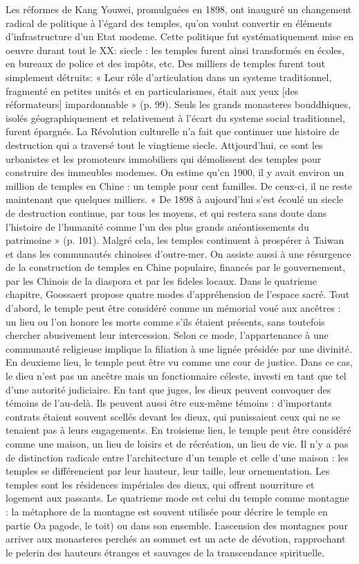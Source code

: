 \begin{singlequote}
Les réformes de Kang Youwei, promulguées en 1898, ont inauguré un changement radical de politique à l'égard des temples, qu'on voulut convertir en éléments d'infrastructure d'un Etat modeme. Cette politique fut systématiquement mise en oeuvre durant tout le XX: siecle : les temples furent ainsi transformés en écoles, en bureaux de police et des impôts, etc. Des milliers de temples furent tout simplement détruits: « Leur rôle d'articulation dans un systeme traditionnel, fragmenté en petites unités et en particularismes, était aux yeux [des réformateurs] impardonnable » (p. 99). Seuls les grands monasteres bouddhiques, isolés géographiquement et relativement à l'écart du systeme social traditionnel, furent épargnés. La Révolution culturelle n'a fait que continuer une histoire de destruction qui a traversé tout le vingtieme siecle. Attjourd'hui, ce sont les urbanistes et les promoteurs immobiliers qui démolissent des temples pour construire des immeubles modemes. On estime qu'cn 1900, il y avait environ un million de temples en Chine : un temple pour
cent familles. De ceux-ci, il ne reste maintenant que quelques milliers. « De 1898 à aujourd'hui s'est écoulé un siecle de destruction continue, par tous les moyens, et qui restera sans doute dans l'histoire de l'humanité comme l'un des plus grands anéantissements du patrimoine » (p. 101). Malgré cela, les temples continuent à prospérer à Taiwan et dans les communautés chinoises d'outre-mer. On assiste aussi à une résurgence de la construction de temples en Chine populaire, financés par le gouvernement, par les Chinois de la diaspora et par les fideles locaux.
Dans le quatrieme chapitre, Goossaert propose quatre modes d'appréhension de l'espace sacré. Tout d'abord, le temple peut être considéré comme un mémorial voué aux ancêtres : un lieu ou l'on honore les morts comme s'ils étaient présents, sans toutefois chercher abusivement leur intercession. Selon ce mode, l'appartenance à une communauté religieuse implique la filiation à une lignée présidée par une divinité. En deuxieme lieu, le temple peut être vu comme une cour de justice. Dans ce cas, le dieu n'est pas un ancêtre mais un fonctionnaire céleste, investi en tant que tel d'une autorité judiciaire. En tant que juges, les dieux peuvent convoquer des témoins de l'au-delà. Ils peuvent aussi être eux-même témoins : d'importants contrats étaient souvent scellés devant les dieux, qui punissaient ceux qui ne se tenaient pas à leurs engagements. En troisieme lieu, le temple peut être considéré comme une maison, un lieu de loisirs et de récréation, un lieu de vie. Il n'y a pas de distinction radicale entre l'architecture d'un temple et celle d'une maison : les temples se différencient par leur hauteur, leur taille, leur ornementation. Les temples sont les résidences impériales des dieux, qui offrent nourriture et logement aux passants. Le quatrieme mode est celui du temple comme montagne : la métaphore de la montagne est souvent utilisée pour décrire le temple en partie Oa pagode, le toit) ou dans son ensemble. I:ascension des montagnes pour arriver aux monasteres perchés au sommet est un acte de dévotion, rapprochant le pelerin des hauteurs étranges et sauvages de la transcendance spirituelle.

\end{singlequote}
